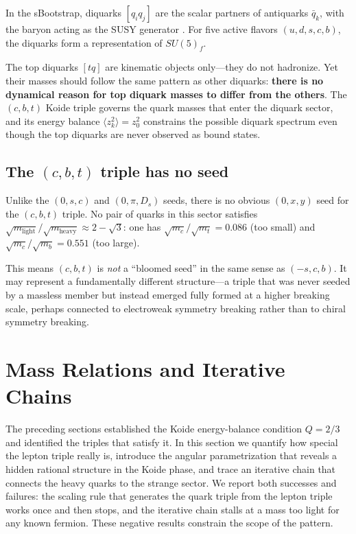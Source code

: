 \documentclass[12pt,a4paper]{article}
\begin{document}
In the sBootstrap, diquarks $[q_i q_j]$ are the scalar partners of 
antiquarks $\bar{q}_k$, with the baryon acting as the SUSY generator 
\cite{CattoGursey, Miyazawa}. For five active flavors 
$(u, d, s, c, b)$, the diquarks form a representation of $SU(5)_f$.

The top diquarks $[tq]$ are kinematic objects only---they do not 
hadronize. Yet their masses should follow the same pattern as other 
diquarks: \textbf{there is no dynamical reason for top diquark masses 
to differ from the others}. The $(c,b,t)$ Koide triple governs the 
quark masses that enter the diquark sector, and its energy balance 
$\langle z_k^2\rangle = z_0^2$ constrains the possible diquark 
spectrum even though the top diquarks are never observed as bound 
states.

\subsection{The $(c,b,t)$ triple has no seed}

Unlike the $(0,s,c)$ and $(0,\pi,D_s)$ seeds, there is no obvious 
$(0, x, y)$ seed for the $(c,b,t)$ triple. No pair of quarks in this 
sector satisfies $\sqrt{m_{\text{light}}}/\sqrt{m_{\text{heavy}}} 
\approx 2 - \sqrt{3}$: one has $\sqrt{m_c}/\sqrt{m_t} = 0.086$ 
(too small) and $\sqrt{m_c}/\sqrt{m_b} = 0.551$ (too large).

This means $(c,b,t)$ is \emph{not} a ``bloomed seed'' in the same 
sense as $(-s,c,b)$. It may represent a fundamentally different 
structure---a triple that was never seeded by a massless member but 
instead emerged fully formed at a higher breaking scale, perhaps 
connected to electroweak symmetry breaking rather than to chiral 
symmetry breaking.

\section{Mass Relations and Iterative Chains}
\label{sec:mass_chains}

The preceding sections established the Koide energy-balance condition
$Q = 2/3$ and identified the triples that satisfy it. In this section
we quantify how special the lepton triple really is, introduce the
angular parametrization that reveals a hidden rational structure in
the Koide phase, and trace an iterative chain that connects the heavy
quarks to the strange sector. We report both successes and failures:
the scaling rule that generates the quark triple from the lepton
triple works once and then stops, and the iterative chain stalls at
a mass too light for any known fermion. These negative results
constrain the scope of the pattern.
\end{document}
